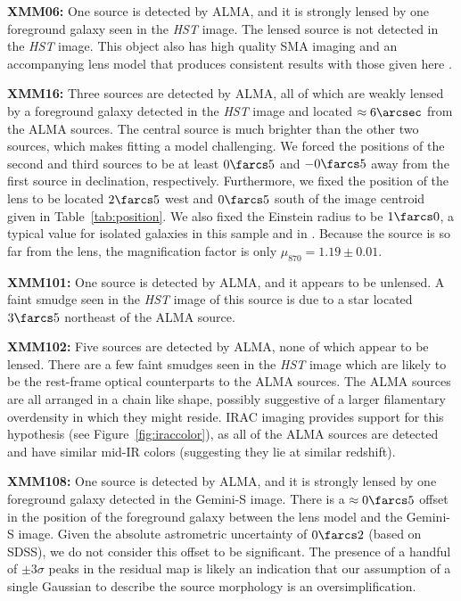 \documentclass[iop]{emulateapj}
\begin{document}
{\bf XMM06:} One source is detected by ALMA, and it is strongly lensed by one
foreground galaxy seen in the {\it HST} image.  The lensed source is not
detected in the {\it HST} image.  This object also has high quality SMA imaging
and an accompanying lens model that produces consistent results with those
given here \citep{Bussmann:2013lr}.

{\bf XMM16:} Three sources are detected by ALMA, all of which are weakly lensed
by a foreground galaxy detected in the {\it HST} image and located $\approx
6\arcsec$ from the ALMA sources.  The central source is much brighter than the
other two sources, which makes fitting a model challenging.  We forced the
positions of the second and third sources to be at least $0\farcs5$ and
$-0\farcs5$ away from the first source in declination, respectively.
Furthermore, we fixed the position of the lens to be located $2\farcs5$ west
and $0\farcs5$ south of the image centroid given in Table~\ref{tab:position}.
We also fixed the Einstein radius to be $1\farcs0$, a typical value for
isolated galaxies in this sample and in \citet{Bussmann:2013lr}.  Because the
source is so far from the lens, the magnification factor is only $\mu_{870} =
1.19 \pm 0.01$.

{\bf XMM101:} One source is detected by ALMA, and it appears to be unlensed.  A
faint smudge seen in the {\it HST} image of this source is due to a star
located $3\farcs5$ northeast of the ALMA source.

{\bf XMM102:} Five sources are detected by ALMA, none of which appear to be
lensed.  There are a few faint smudges seen in the {\it HST} image which are
likely to be the rest-frame optical counterparts to the ALMA sources.  The ALMA
sources are all arranged in a chain like shape, possibly suggestive of a larger
filamentary overdensity in which they might reside.  IRAC imaging provides
support for this hypothesis (see Figure~\ref{fig:iraccolor}), as all of the ALMA
sources are detected and have similar mid-IR colors (suggesting they lie at
similar redshift).

{\bf XMM108:} One source is detected by ALMA, and it is strongly lensed by one
foreground galaxy detected in the Gemini-S image.  There is a $\approx
0\farcs5$ offset in the position of the foreground galaxy between the lens
model and the Gemini-S image.  Given the absolute astrometric uncertainty of
$0\farcs2$ (based on SDSS), we do not consider this offset to be significant.
The presence of a handful of $\pm3\sigma$ peaks in the residual map is likely
an indication that our assumption of a single Gaussian to describe the source
morphology is an oversimplification.
\end{document}
